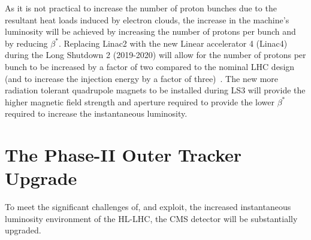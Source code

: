 As it is not practical to increase the number of proton bunches due to the resultant heat loads induced by electron clouds, the increase in the machine's luminosity will be achieved by increasing the number of protons per bunch and by reducing $\beta^{*}$.
Replacing Linac2 with the new Linear accelerator 4 (Linac4) during the Long Shutdown 2 (2019-2020) will allow for the number of protons per bunch to be increased by a factor of two compared to the nominal LHC design (and to increase the injection energy by a factor of three)~\cite{linac4}.
The new more radiation tolerant quadrupole magnets to be installed during LS3 will provide the higher magnetic field strength and aperture required to provide the lower $\beta^{*}$ required to increase the instantaneous luminosity. 

\section{The Phase-II Outer Tracker Upgrade}\label{sec:tk-upgrade}
To meet the significant challenges of, and exploit, the increased instantaneous luminosity environment of the HL-LHC, the CMS detector will be substantially upgraded.

